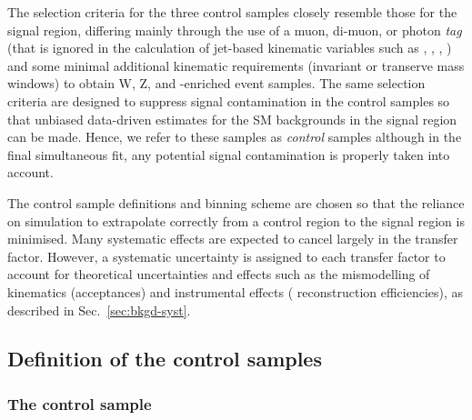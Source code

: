 The selection criteria for the three control samples closely resemble
those for the signal region, differing mainly through the use of a
muon, di-muon, or photon {\it tag} (that is ignored in the calculation
of jet-based kinematic variables such as \scalht, \mht, \alphat, \etc)
and some minimal additional kinematic requirements (\eg invariant or
transerve mass windows) to obtain W, Z, and \ttbar-enriched event
samples. The same selection criteria are designed to suppress signal
contamination in the control samples so that unbiased data-driven
estimates for the SM backgrounds in the signal region can be
made. Hence, we refer to these samples as {\it control} samples
although in the final simultaneous fit, any potential signal
contamination is properly taken into account.

The control sample definitions and binning scheme are chosen so that
the reliance on simulation to extrapolate correctly from a control
region to the signal region is minimised. Many systematic effects are
expected to cancel largely in the transfer factor. However, a
systematic uncertainty is assigned to each transfer factor to account
for theoretical uncertainties and effects such as the mismodelling of
kinematics (\eg acceptances) and instrumental effects (\eg
reconstruction efficiencies), as described in
Sec.~\ref{sec:bkgd-syst}.


\subsection{Definition of the control samples\label{sec:def-control-samples}}

\subsubsection{The \texorpdfstring{\mj}{muon plus jets} control sample}

